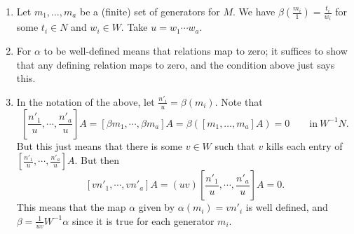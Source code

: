 \documentclass[12pt]{amsart}
\renewcommand{\1}{\mathbbm{1}}
\newcommand{\solution}[1]{\ifthenelse {\equal{\displaysol}{1}} {\begin{framed}{\color{meretale}\noindent #1}\end{framed}} { \ }}
\begin{document}
\begin{enumerate}
\solution{
\begin{enumerate}
\item Let $m_1,\dots,m_a$ be a (finite) set of generators for $M$. We have $\beta(\frac{m_i}{1}) = \frac{t_i}{w_i}$ for some $t_i\in N$ and $w_i\in W$. Take $u=w_1\cdots w_a$.
\item For $\alpha$ to be well-defined means that relations map to zero; it suffices to show that any defining relation maps to zero, and the condition above just says this.
\item In the notation of the above, let $\frac{n'_i}{u} = \beta(m_i)$. Note that 
\[ [\frac{n'_1}{u}, \cdots , \frac{n'_a}{u}] A = [\beta{m_1}, \cdots ,\beta{m_a}] A = \beta( [m_1,\dots,m_a] A) = 0 \qquad \text{in} \ W^{-1}N. \] But this just means that there is some $v\in W$ such that $v$ kills each entry of $ [\frac{n'_1}{u}, \cdots , \frac{n'_a}{u}] A$. But then
\[ [vn'_1, \cdots , vn'_a] A = (uv)   [\frac{n'_1}{u}, \cdots , \frac{n'_a}{u}] A = 0.\]
This means that the map $\alpha$ given by $\alpha(m_i)=vn'_i$ is well defined, and $\beta = \frac{1}{uv}W^{-1}\alpha$ since it is true for each generator $m_i$.
\end{enumerate}}



\end{enumerate}
\vfill
\end{document}
